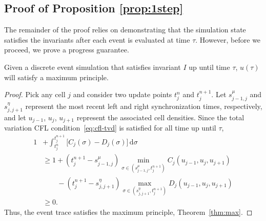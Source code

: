 

\subsection{Proof of Proposition \ref{prop:1step}}
The remainder of the proof relies on demonstrating that the simulation state satisfies the invariants after each event is evaluated at time $\tau$. However, before we proceed, we prove a progress guarantee.

\begin{proposition}
Given a discrete event simulation that satisfies invariant $I$ up until time $\tau$, $u(\tau)$ will satisfy a maximum principle.
\label{prop:des-max}
\end{proposition}
\begin{proof}
Pick any cell $j$ and consider two update points $t_j^n$ and $t_j^{n+1}$. Let $s_{j-1,j}^{\mu}$ and $s_{j,j+1}^{\eta}$ represent the most recent left and right synchronization times, respectively, and let $u_{j-1}$, $u_j$, $u_{j+1}$ represent the associated cell densities.
Since the total variation CFL condition~\eqref{eq:cfl-tvd} is satisfied for all time up until $\tau$,
\begin{align*}
1 &+ \int_{t_j^n}^{t_j^{n+1}} \big[C_j(\sigma) - D_j(\sigma) \big]\,\mathrm{d} \sigma\\
& \ge 1 + (t_j^{n+1} - s_{j-1,j}^{\mu}) \min_{\sigma \in (s_{j-1,j}^{\mu},t_j^{n+1})} C_j(u_{j-1}, u_j, u_{j+1})\\
& \quad\quad - (t_j^{n+1} - s_{j,j+1}^{\eta}) \max_{\sigma \in (s_{j,j+1}^{\eta}, t_j^{n+1})}D_j(u_{j-1}, u_j, u_{j+1})\\
& \ge 0.
\end{align*}
Thus, the event trace satisfies the maximum principle, Theorem~\ref{thm:max}.
\end{proof}

